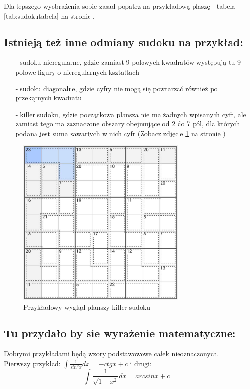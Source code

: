 Dla lepszego wyobrażenia sobie zasad popatrz na przykładową plaszę - tabela \ref{tab:sudokutabela} na stronie \pageref{tab:sudokutabela}.



\subsection{Istnieją też inne odmiany sudoku na przykład:}
    \begin{itemize}
        \item[-]sudoku nieregularne, gdzie zamiast 9-polowych kwadratów występują tu 9-polowe figury o nieregularnych kształtach
        \item[-]sudoku diagonalne, gdzie cyfry nie mogą się powtarzać również po przekątnych kwadratu
        \item[-]killer sudoku, gdzie początkowa plansza nie ma żadnych wpisanych cyfr, ale zamiast tego ma zaznaczone obszary obejmujące od 2 do 7 pól, dla których podana jest suma zawartych w nich cyfr (Zobacz zdjęcie \ref{fig:sudokuprzyklad} na stronie \pageref{fig:sudokuprzyklad})
    \end{itemize}

\begin{figure}[htbp]
    \centering
    \includegraphics[width=0.75\textwidth]{pictures/sudokuprzyklad.jpg}
    \caption{Przykładowy wygląd planszy killer sudoku}
    \label{fig:sudokuprzyklad}
\end{figure} 

\subsection{Tu przydało by sie wyrażenie matematyczne:}
Dobrymi przykładami będą wzory podstawowowe całek nieoznaczonych. \\Pierwszy przykład: \( \int \frac{1}{sin^2 x}dx = -ctg x +c \) i drugi: 
\begin{equation}
    \int \frac{1}{\sqrt{1-x^2}}dx = arcsin x+c
\end{equation}
